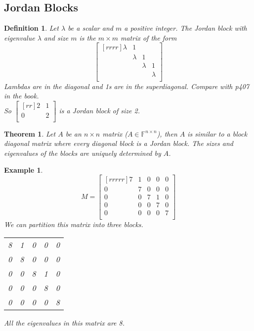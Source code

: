\documentclass{report}
\newtheorem*{ex}{Example}
\newtheorem*{defn}{Definition}
\newtheorem*{thrm}{Theorem}
\begin{document}
\subsection{Jordan Blocks}
\begin{defn}
Let $\lambda$ be a scalar and $m$ a positive integer. The Jordan block with eigenvalue $\lambda$ and size $m$ is the $m\times m$ matrix of the form
\[ \begin{bmatrix}[rrrr]\lambda&1&{}&{}\\{}&\lambda&1&{}\\{}&{}&\lambda&1\\{}&{}&{}&\lambda\\\end{bmatrix} \]
Lambdas are in the diagonal and 1s are in the superdiagonal. Compare with p407 in the book.\\
So $\begin{bmatrix}[rr]2&1\\0&2\\\end{bmatrix}$ is a Jordan block of size 2.
\end{defn}
\begin{thrm}
Let $A$ be an $n\times n$ matrix ($A\in \mathbb{F}^{n\times n}$), then $A$ is similar to a block diagonal matrix where every diagonal block is a Jordan block. The sizes and eigenvalues of the blocks are uniquely determined by $A$.
\end{thrm}
\begin{ex}
\[ M=\begin{bmatrix}[rrrrr]7&1&0&0&0\\0&7&0&0&0\\0&0&7&1&0\\0&0&0&7&0\\0&0&0&0&7\\\end{bmatrix} \]
We can partition this matrix into three blocks.
\begin{tabular}{cc|cc|c}
8&1&0&0&0\\
0&8&0&0&0\\
\hline
0&0&8&1&0\\
0&0&0&8&0\\
\hline
0&0&0&0&8\\
\end{tabular}
All the eigenvalues in this matrix are 8.
\end{ex}
\end{document}

